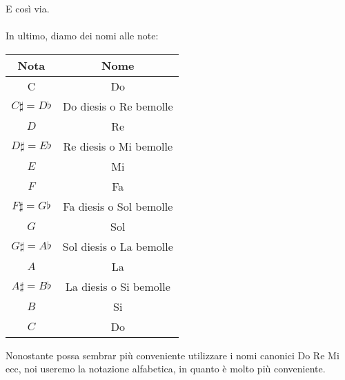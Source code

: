 \documentclass[12pt,a4paper]{book}
\theoremstyle{definition}
\theoremstyle{Theorem}
\theoremstyle{definition}
\theoremstyle{definition}
\theoremstyle{definition}
\begin{document}
	  E così via.\\
	  \\
	  In ultimo, diamo dei nomi alle note: 
	   \begin{center}
	  	\begin{tabular}{||c|c||} 
	  		\hline
	  		Nota & Nome \\ [0.5ex] 
	  		\hline\hline
	  		C & Do\\ 
	  		\hline
	  		$C\sharp=D\flat$ & Do diesis o Re bemolle \\
	  		\hline
	  		$D$ & Re\\
	  		\hline
	  		$D\sharp=E\flat$ & Re diesis o Mi bemolle\\
	  		\hline
	  		$E$ & Mi \\ [1ex] 
	  		\hline
	  		$F$ & Fa \\
	  		\hline
	  		$F\sharp=G\flat$ & Fa diesis o Sol bemolle\\
	  		\hline
	  		$G$ & Sol\\
	  		\hline
	  		$G\sharp=A\flat$ & Sol diesis o La bemolle \\  
	  		\hline
	  		$A$ & La \\
	  		\hline
	  		$A\sharp=B\flat$ & La diesis o Si bemolle\\
	  		\hline
	  		$B$ & Si\\
	  		\hline
	  		$C$ & Do \\  
	  		\hline
	  	\end{tabular}
	  \end{center}
	  Nonostante possa sembrar più conveniente utilizzare i nomi canonici Do Re Mi ecc, noi useremo la notazione alfabetica, in quanto è molto più conveniente.
\end{document}
